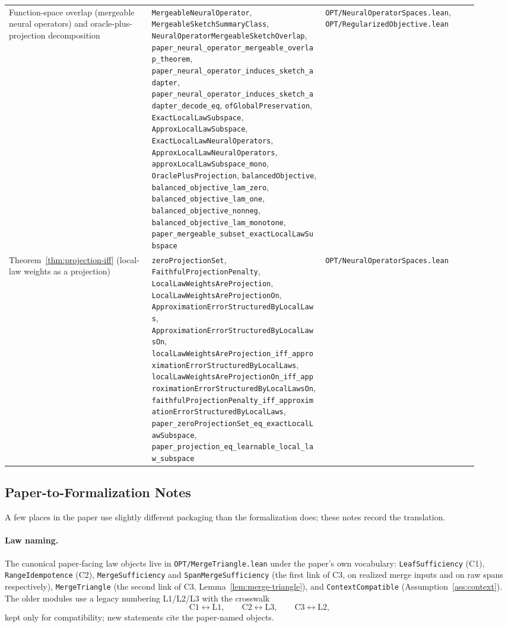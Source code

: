 {\begin{longtable}{p{0.28\linewidth}p{0.34\linewidth}p{0.30\linewidth}}
Function-space overlap (mergeable neural operators) and oracle-plus-projection decomposition &
\texttt{MergeableNeuralOperator}, \texttt{MergeableSketchSummaryClass}, \texttt{NeuralOperatorMergeableSketchOverlap}, \texttt{paper\_neural\_operator\_mergeable\_overlap\_theorem}, \texttt{paper\_neural\_operator\_induces\_sketch\_adapter}, \texttt{paper\_neural\_operator\_induces\_sketch\_adapter\_decode\_eq}, \texttt{ofGlobalPreservation}, \texttt{ExactLocalLawSubspace}, \texttt{ApproxLocalLawSubspace}, \texttt{ExactLocalLawNeuralOperators}, \texttt{ApproxLocalLawNeuralOperators}, \texttt{approxLocalLawSubspace\_mono}, \texttt{OraclePlusProjection}, \texttt{balancedObjective}, \texttt{balanced\_objective\_lam\_zero}, \texttt{balanced\_objective\_lam\_one}, \texttt{balanced\_objective\_nonneg}, \texttt{balanced\_objective\_lam\_monotone}, \texttt{paper\_mergeable\_subset\_exactLocalLawSubspace} &
\texttt{OPT/NeuralOperatorSpaces.lean}, \texttt{OPT/RegularizedObjective.lean} \\

Theorem~\ref{thm:projection-iff} (local-law weights as a projection) &
\texttt{zeroProjectionSet}, \texttt{FaithfulProjectionPenalty}, \texttt{LocalLawWeightsAreProjection}, \texttt{LocalLawWeightsAreProjectionOn}, \texttt{ApproximationErrorStructuredByLocalLaws}, \texttt{ApproximationErrorStructuredByLocalLawsOn}, \texttt{localLawWeightsAreProjection\_iff\_approximationErrorStructuredByLocalLaws}, \texttt{localLawWeightsAreProjectionOn\_iff\_approximationErrorStructuredByLocalLawsOn}, \texttt{faithfulProjectionPenalty\_iff\_approximationErrorStructuredByLocalLaws}, \texttt{paper\_zeroProjectionSet\_eq\_exactLocalLawSubspace}, \texttt{paper\_projection\_eq\_learnable\_local\_law\_subspace} &
\texttt{OPT/NeuralOperatorSpaces.lean} \\
\end{longtable}
}

\subsection{Paper-to-Formalization Notes}

A few places in the paper use slightly different packaging than the
formalization does; these notes record the translation.

\paragraph{Law naming.} The canonical paper-facing law objects live in
\texttt{OPT/MergeTriangle.lean} under the paper's own vocabulary:
\texttt{LeafSufficiency} (C1), \texttt{RangeIdempotence} (C2),
\texttt{MergeSufficiency} and \texttt{SpanMergeSufficiency} (the first
link of C3, on realized merge inputs and on raw spans respectively),
\texttt{MergeTriangle} (the second link of C3,
Lemma~\ref{lem:merge-triangle}), and \texttt{ContextCompatible}
(Assumption~\ref{ass:context}). The older modules use a legacy numbering
L1/L2/L3 with the crosswalk
\[
\text{C1} \leftrightarrow \text{L1},\qquad
\text{C2} \leftrightarrow \text{L3},\qquad
\text{C3} \leftrightarrow \text{L2},
\]
kept only for compatibility; new statements cite the paper-named objects.

